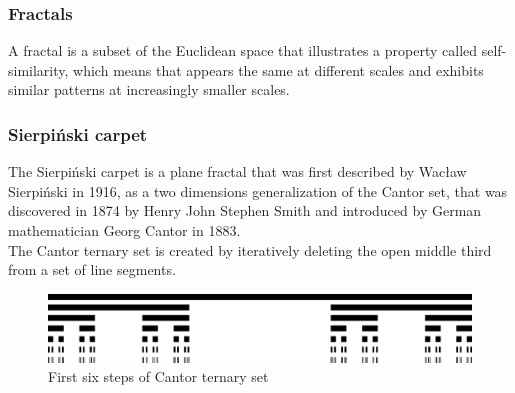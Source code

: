 \documentclass{article}
\begin{document}
\subsubsection{Fractals}
A fractal is a subset of the Euclidean space that illustrates a property called self-similarity, which means that appears the same at different scales and exhibits similar patterns at increasingly smaller scales. 

\subsubsection{Sierpiński carpet}
The Sierpiński carpet is a plane fractal that was first described by Wacław Sierpiński in 1916, as a two dimensions generalization of the Cantor set, that was discovered in 1874 by Henry John Stephen Smith and introduced by German mathematician Georg Cantor in 1883.\\

The Cantor ternary set is created by iteratively deleting the open middle third from a set of line segments.

\begin{figure}[h]
    \includegraphics[width=\textwidth]{./cantor.png}
    \caption{First six steps of Cantor ternary set}
\end{figure}
\end{document}
